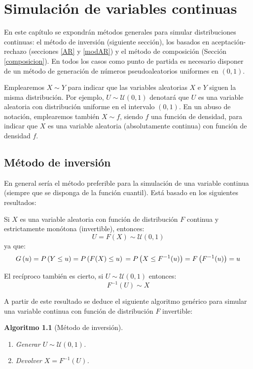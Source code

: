 \documentclass[
  10pt,
]{book}
\theoremstyle{break}
\newtheorem{conjecture}{Algoritmo}[chapter]
\theoremstyle{nonumberplain}
\begin{document}
\hypertarget{continuas}{%
\chapter{Simulación de variables continuas}\label{continuas}}

En este capítulo se expondrán métodos generales para simular distribuciones continuas: el método de inversión (siguiente sección), los basados en aceptación-rechazo (secciones \ref{AR} y \ref{modAR}) y el método de composición (Sección \ref{composicion}).
En todos los casos como punto de partida es necesario disponer de un método de generación de números pseudoaleatorios uniformes en \((0,1)\).

Emplearemos \(X \sim Y\) para indicar que las variables aleatorias \(X\) e \(Y\) siguen la misma distribución.
Por ejemplo, \(U \sim \mathcal{U}(0,1)\) denotará que \(U\) es una variable aleatoria con distribución uniforme en el intervalo \((0,1)\).
En un abuso de notación, emplearemos también \(X \sim f\), siendo \(f\) una función de densidad, para indicar que \(X\) es una variable aleatoria (absolutamente continua) con función de densidad \(f\).

\hypertarget{inversion}{%
\section{Método de inversión}\label{inversion}}

En general sería el método preferible para la simulación de una variable continua (siempre que se disponga de la función cuantil).
Está basado en los siguientes resultados:

Si \(X\) es una variable aleatoria con función de distribución \(F\) continua y estrictamente monótona (invertible), entonces:
\[U = F\left( X \right) \sim \mathcal{U}(0, 1)\]
ya que:
\[G\left( u \right) = P\left( Y \leq u \right) 
= P\left( F(X) \leq u \right) \\
= P\left( X \leq F^{-1}(u) \right) 
= F\left( F^{-1}(u) \right) = u\]

El recíproco también es cierto, si \(U \sim \mathcal{U}(0, 1)\) entonces:
\[F^{-1}\left( U \right) \sim X\]

A partir de este resultado se deduce el siguiente algoritmo genérico para simular una variable continua con función de distribución \(F\) invertible:

\begin{conjecture}[Método de inversión]
\protect\hypertarget{cnj:inversion}{}\label{cnj:inversion}

\begin{enumerate}
\def\labelenumi{\arabic{enumi}.}
\item
  Generar \(U \sim \mathcal{U}(0, 1)\).
\item
  Devolver \(X = F^{-1}\left( U \right)\).
\end{enumerate}

\end{conjecture}
\end{document}
